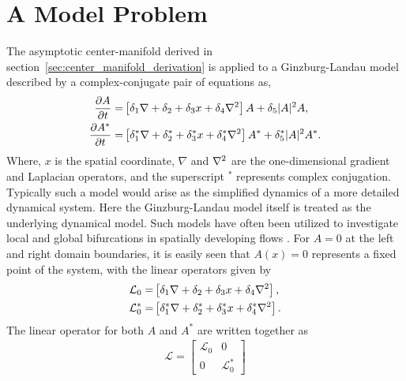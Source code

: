 \section{A Model Problem}
\label{sec:ginzburg_landau}

The asymptotic center-manifold derived in section~\ref{sec:center_manifold_derivation} is applied to a Ginzburg-Landau model described by a complex-conjugate pair of equations as,
\begin{subequations}
	\label{eqn:ginzburg_landau}
	\begin{align}
		\dfrac{\partial A}{\partial t} =& \left[\delta_{1}\nabla + \delta_{2} + \delta_{3}x + \delta_{4}\nabla^{2}\right]A + \delta_{5}|A|^{2}A, \\
		\dfrac{\partial A^{*}}{\partial t} =& \left[\delta^{*}_{1}\nabla + \delta^{*}_{2} + \delta^{*}_{3}x + \delta^{*}_{4}\nabla^{2}\right]A^{*} + \delta^{*}_{5}|A|^{2}A^{*}. 
	\end{align}
\end{subequations}
Where, $x$ is the spatial coordinate, $\nabla$ and $\nabla^{2}$ are the one-dimensional gradient and Laplacian operators, and the superscript $^{*}$ represents complex conjugation. Typically such a model would arise as the simplified dynamics of a more detailed dynamical system. Here the Ginzburg-Landau model itself is treated as the underlying dynamical model. Such models have often been utilized to investigate local and global bifurcations in spatially developing flows \citep{chomaz88,chomaz05}. For $A=0$ at the left and right domain boundaries, it is easily seen that $A(x)=0$ represents a fixed point of the system, with the linear operators given by
\begin{align}
	\mathcal{L}_{0}	=& \left[\delta_{1}\nabla + \delta_{2} + \delta_{3}x + \delta_{4}\nabla^{2}\right], \nonumber \\
	\mathcal{L}^{*}_{0} =&\left[\delta^{*}_{1}\nabla + \delta^{*}_{2} + \delta^{*}_{3}x + \delta^{*}_{4}\nabla^{2}\right]. \nonumber
\end{align}
The linear operator for both $A$ and $A^{*}$ are written together as
\begin{eqnarray}
	\mathcal{L} = \begin{bmatrix}
		\mathcal{L}_{0}		& 0 \\
		0								  & \mathcal{L}^{*}_{0}
	\end{bmatrix}
\end{eqnarray}

